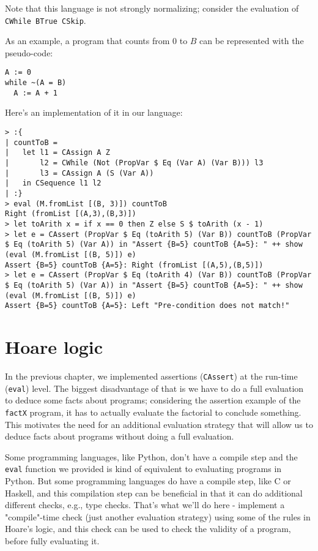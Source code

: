 \documentclass{article}
\begin{document}
Note that this language is not strongly normalizing; consider the evaluation of \texttt{CWhile BTrue CSkip}.

As an example, a program that counts from 0 to $B$ can be represented with the pseudo-code:

\begin{lstlisting}
A := 0
while ~(A = B)
  A := A + 1
\end{lstlisting}

Here's an implementation of it in our language:

\begin{lstlisting}
> :{
| countToB =
|   let l1 = CAssign A Z
|       l2 = CWhile (Not (PropVar $ Eq (Var A) (Var B))) l3
|       l3 = CAssign A (S (Var A))
|   in CSequence l1 l2
| :}
> eval (M.fromList [(B, 3)]) countToB
Right (fromList [(A,3),(B,3)])
> let toArith x = if x == 0 then Z else S $ toArith (x - 1)
> let e = CAssert (PropVar $ Eq (toArith 5) (Var B)) countToB (PropVar $ Eq (toArith 5) (Var A)) in "Assert {B=5} countToB {A=5}: " ++ show (eval (M.fromList [(B, 5)]) e)
Assert {B=5} countToB {A=5}: Right (fromList [(A,5),(B,5)])
> let e = CAssert (PropVar $ Eq (toArith 4) (Var B)) countToB (PropVar $ Eq (toArith 5) (Var A)) in "Assert {B=5} countToB {A=5}: " ++ show (eval (M.fromList [(B, 5)]) e)
Assert {B=5} countToB {A=5}: Left "Pre-condition does not match!"
\end{lstlisting}

\section{Hoare logic}

In the previous chapter, we implemented assertions (\texttt{CAssert}) at the run-time (\texttt{eval}) level. The biggest disadvantage of that is we have to do a full evaluation to deduce some facts about programs; considering the assertion example of the \texttt{factX} program, it has to actually evaluate the factorial to conclude something. This motivates the need for an additional evaluation strategy that will allow us to deduce facts about programs without doing a full evaluation.

Some programming languages, like Python, don't have a compile step and the \texttt{eval} function we provided is kind of equivalent to evaluating programs in Python. But some programming languages do have a compile step, like C or Haskell, and this compilation step can be beneficial in that it can do additional different checks, e.g., type checks. That's what we'll do here - implement a "compile"-time check (just another evaluation strategy) using some of the rules in Hoare's logic, and this check can be used to check the validity of a program, before fully evaluating it.
\end{document}
